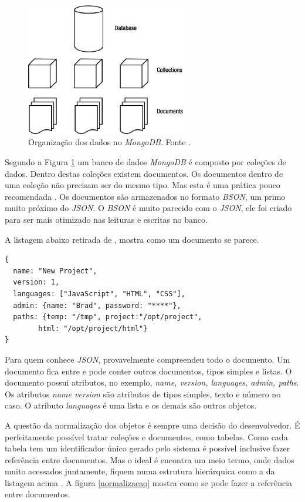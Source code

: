 \begin{figure}[ht]
	\centering
	\includegraphics[width=7cm]{figuras/mongodb.eps}
	\caption{Organização dos dados no \emph{MongoDB}. Fonte \cite{Plugge2014}.}
	\label{mongodb}
\end{figure}

Segundo a Figura \ref{mongodb} um banco de dados \emph{MongoDB} é composto por coleções de dados. 
Dentro destas coleções existem documentos. 
Os documentos dentro de uma coleção não precisam ser do mesmo tipo. 
Mas esta é uma prática pouco recomendada \cite{Plugge2014}. 
Os documentos são armazenados no formato \emph{BSON}, um primo muito próximo do \emph{JSON}. 
O \emph{BSON} é muito parecido com o \emph{JSON}, ele foi criado para ser mais otimizado nas leituras e escritas no banco.

A listagem abaixo retirada de , mostra como um documento se parece.

\lstset{language=java}
\begin{lstlisting}[frame=single]
{
  name: "New Project",
  version: 1,
  languages: ["JavaScript", "HTML", "CSS"],
  admin: {name: "Brad", password: "****"},
  paths: {temp: "/tmp", project:"/opt/project", 
  		html: "/opt/project/html"}
}
\end{lstlisting}

Para quem conhece \emph{JSON}, provavelmente compreendeu todo o documento. Um documento fica entre {} e pode conter outros documentos, tipos simples e listas.
O documento possui atributos, no exemplo, \emph{name, version, languages, admin, paths}. Os atributos \emph{name version} são atributos de tipos simples, texto e número no caso. O atributo \emph{languages} é uma lista e os demais são outros objetos.

A questão da normalização dos objetos é sempre uma decisão do desenvolvedor. É perfeitamente possível tratar coleções e documentos, como tabelas. Como cada tabela tem um identificador único gerado pelo sistema é possível inclusive fazer referência entre documentos. Mas o ideal é encontra um meio termo, onde dados muito acessados juntamente, fiquem numa estrutura hierárquica como a da listagem acima \cite{Dayley2014}. A figura \ref{normalizacao} mostra como se pode fazer a referência entre documentos.

